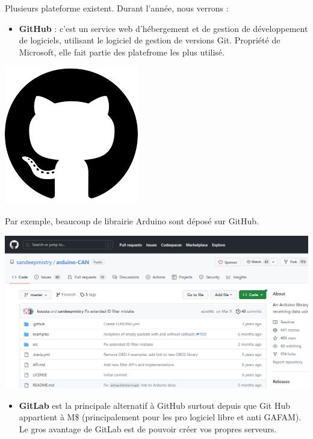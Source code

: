 \documentclass[french, 12pt]{article}%
\newcommand{\itemE}{\item[$\bullet$]}
\begin{document}
Plusieurs plateforme existent. Durant l'année, nous verrons : 

\begin{itemize}
\itemE \textbf{GitHub} : c'est un service web d'hébergement et de gestion de développement de logiciels, utilisant le logiciel de gestion de versions Git. Propriété de Microsoft, elle fait partie des platefrome les plus utilisé.
\end{itemize}

\begin{center}
\includegraphics[scale=0.1]{./ressource/gitLogo}
\end{center}

 Par exemple, beaucoup de librairie Arduino sont déposé sur GitHub. 
\begin{center}
\includegraphics[scale=0.4]{./ressource/interfaceGitHub}
\end{center}


\begin{itemize}
\itemE \textbf{GitLab} est la principale alternatif à GitHub surtout depuis que Git Hub appartient à M\$ (principalement pour les pro logiciel libre et anti GAFAM). Le gros avantage de GitLab est de pouvoir créer vos propres serveurs.
\end{itemize}
\end{document}
